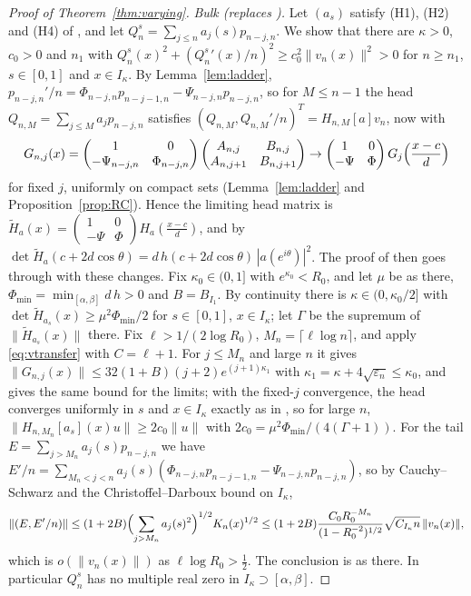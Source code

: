 \documentclass[11pt]{amsart}
\theoremstyle{definition}
\theoremstyle{remark}
\numberwithin{equation}{section}
\newcommand{\eps}{\varepsilon}
\begin{document}
\begin{proof}[Proof of Theorem~\ref{thm:varying}]
\emph{Bulk (replaces \cite[Proposition~\ref{M-prop:bulk}]{Main}).} Let $(a_s)$ satisfy (H1), (H2) and (H4) of \cite[Hypothesis~\ref{M-hyp:H}]{Main}, and let $Q_n^s=\sum_{j\le n}a_j(s)p_{n-j,n}$. We show that there are $\kappa>0$, $c_0>0$ and $n_1$ with $Q_n^s(x)^2+(Q_n^s{}'(x)/n)^2\ge c_0^2\|v_n(x)\|^2>0$ for $n\ge n_1$, $s\in[0,1]$ and $x\in I_\kappa$. By Lemma~\ref{lem:ladder}, $p_{n-j,n}'/n=\Phi_{n-j,n}p_{n-j-1,n}-\Psi_{n-j,n}p_{n-j,n}$, so for $M\le n-1$ the head $Q_{n,M}=\sum_{j\le M}a_jp_{n-j,n}$ satisfies $(Q_{n,M},Q_{n,M}'/n)^T=H_{n,M}[a]v_n$, now with
\[
G_{n,j}(x)=\begin{pmatrix}1&0\\-\Psi_{n-j,n}&\Phi_{n-j,n}\end{pmatrix}\begin{pmatrix}A_{n,j}&B_{n,j}\\A_{n,j+1}&B_{n,j+1}\end{pmatrix}\to\begin{pmatrix}1&0\\-\Psi&\Phi\end{pmatrix}G_j\Bigl(\frac{x-c}d\Bigr)
\]
for fixed $j$, uniformly on compact sets (Lemma~\ref{lem:ladder} and Proposition~\ref{prop:RC}). Hence the limiting head matrix is $\widetilde H_a(x)=\begin{pmatrix}1&0\\-\Psi&\Phi\end{pmatrix}H_a(\frac{x-c}d)$, and by \cite[Lemma~\ref{M-lem:limit}]{Main} $\det\widetilde H_a(c+2d\cos\theta)=d\,h(c+2d\cos\theta)\,|a(e^{i\theta})|^2$. The proof of \cite[Proposition~\ref{M-prop:bulk}]{Main} then goes through with these changes. Fix $\kappa_0\in(0,1]$ with $e^{\kappa_0}<R_0$, and let $\mu$ be as there, $\Phi_{\min}=\min_{[\alpha,\beta]}d\,h>0$ and $B=B_{I_1}$. By continuity there is $\kappa\in(0,\kappa_0/2]$ with $\det\widetilde H_{a_s}(x)\ge\mu^2\Phi_{\min}/2$ for $s\in[0,1]$, $x\in I_\kappa$; let $\Gamma$ be the supremum of $\|\widetilde H_{a_s}(x)\|$ there. Fix $\ell>1/(2\log R_0)$, $M_n=\lceil\ell\log n\rceil$, and apply \eqref{eq:vtransfer} with $C=\ell+1$. For $j\le M_n$ and large $n$ it gives $\|G_{n,j}(x)\|\le32(1+B)(j+2)e^{(j+1)\kappa_1}$ with $\kappa_1=\kappa+4\sqrt{\eps_n}\le\kappa_0$, and \cite[Lemma~\ref{M-lem:chebyshev}]{Main} gives the same bound for the limits; with the fixed-$j$ convergence, the head converges uniformly in $s$ and $x\in I_\kappa$ exactly as in \cite[\eqref{M-eq:head-conv}]{Main}, so for large $n$, $\|H_{n,M_n}[a_s](x)u\|\ge2c_0\|u\|$ with $2c_0=\mu^2\Phi_{\min}/(4(\Gamma+1))$. For the tail $E=\sum_{j>M_n}a_j(s)p_{n-j,n}$ we have $E'/n=\sum_{M_n<j<n}a_j(s)(\Phi_{n-j,n}p_{n-j-1,n}-\Psi_{n-j,n}p_{n-j,n})$, so by Cauchy--Schwarz and the Christoffel--Darboux bound on $I_\kappa$,
\[
\|(E,E'/n)\|\le(1+2B)\Bigl(\sum_{j>M_n}a_j(s)^2\Bigr)^{1/2}K_n(x)^{1/2}\le(1+2B)\frac{C_0R_0^{-M_n}}{(1-R_0^{-2})^{1/2}}\sqrt{C_{I_\kappa}n}\,\|v_n(x)\|,
\]
which is $o(\|v_n(x)\|)$ as $\ell\log R_0>\frac12$. The conclusion is as there. In particular $Q_n^s$ has no multiple real zero in $I_\kappa\supset[\alpha,\beta]$.


\end{proof}
\end{document}
